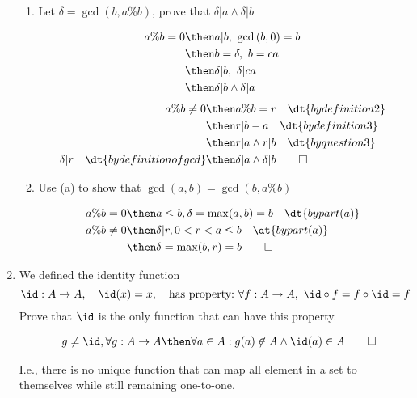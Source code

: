 \documentclass[basic, header]{nosvagor-notes}
\begin{document}
\begin{enumerate}[itemsep=8em]
\begin{enumerate}
        \item Let \(\delta = \gcd(b, a\%b)\), prove that \(\delta|a \land
          \delta|b\)

          \begin{align*}
            a\%b = 0 &\then a|b,~\gcd{(b,0)} = b \\
                     &\then b = \delta,~ b = ca \\
                     &\then \delta|b,~ \delta|ca \\
                     &\then \delta|b \land \delta|a
          \end{align*}
          \begin{align*}
            a\%b \neq 0 &\then a\%b = r \quad \dt{by definition 2} \\
                        &\then r|b-a \quad \dt{by definition 3} \\
                        &\then r|a \land r|b \quad \dt{by question 3} \\
                        \delta | r \quad \dt{by definition of gcd}
                        &\then \delta|a \land \delta|b \qed
          \end{align*}

        \item Use (a) to show that \(\gcd(a,b) = \gcd(b, a\%b)\)

          \begin{align*}
            a\%b = 0 &\then a \leq b, \delta = \max(a,b) = b \quad \dt{by part (a)} \\
            a\%b \neq 0 &\then \delta|r, 0 < r < a \leq b \quad \dt{by part (a)} \\
            &\then \delta = \max(b, r) = b \qed
          \end{align*}

      \end{enumerate}

  \newpage %

    \item We defined the identity function
      \[%
       \id : A \to A, \quad \id(x) = x, \quad  \text{has property:}~\forall f :
       A\to A,~ \id \circ f = f \circ \id = f
      \]%
      Prove that \(\id\) is the only function that can have this property.

      \begin{align*}
        \quad g \neq \id, \forall g : A \to A \then \forall a \in A : g(a)\not\in A \land \id(a) \in A \qed
      \end{align*}

      I.e., there is no unique function that can map all element in a set to
      themselves while still remaining one-to-one.

\end{enumerate}
\end{document}
